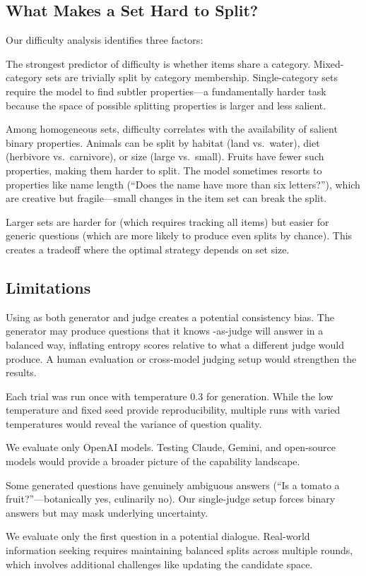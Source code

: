 \subsection{What Makes a Set Hard to Split?}

Our difficulty analysis identifies three factors:

The strongest predictor of difficulty is whether items share a category.
Mixed-category sets are trivially split by category membership.
Single-category sets require the model to find subtler properties---a fundamentally harder task because the space of possible splitting properties is larger and less salient.

Among homogeneous sets, difficulty correlates with the availability of salient binary properties.
Animals can be split by habitat (land vs.\ water), diet (herbivore vs.\ carnivore), or size (large vs.\ small).
Fruits have fewer such properties, making them harder to split.
The model sometimes resorts to properties like name length (``Does the name have more than six letters?''), which are creative but fragile---small changes in the item set can break the split.

Larger sets are harder for \chainofthought (which requires tracking all items) but easier for generic questions (which are more likely to produce even splits by chance).
This creates a tradeoff where the optimal strategy depends on set size.

\subsection{Limitations}
\label{sec:limitations}

Using \gptfull as both generator and judge creates a potential consistency bias.
The generator may produce questions that it knows \gptfull-as-judge will answer in a balanced way, inflating entropy scores relative to what a different judge would produce.
A human evaluation or cross-model judging setup would strengthen the results.

Each trial was run once with temperature 0.3 for generation.
While the low temperature and fixed seed provide reproducibility, multiple runs with varied temperatures would reveal the variance of question quality.

We evaluate only OpenAI models.
Testing Claude, Gemini, and open-source models would provide a broader picture of the capability landscape.

Some generated questions have genuinely ambiguous answers (\eg ``Is a tomato a fruit?''---botanically yes, culinarily no).
Our single-judge setup forces binary answers but may mask underlying uncertainty.

We evaluate only the first question in a potential dialogue.
Real-world information seeking requires maintaining balanced splits across multiple rounds, which involves additional challenges like updating the candidate space.
